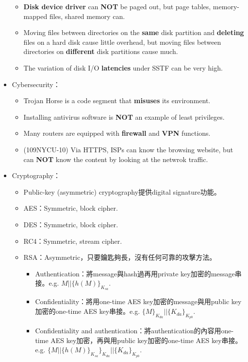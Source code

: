 \begin{itemize}
\begin{itemize}
        \item \textbf{Disk device driver} can \textbf{NOT} be paged out, but page tables, memory-mapped files, shared memory can.
        \item Moving files between directories on the \textbf{same} disk partition and \textbf{deleting} files on a hard disk cause little overhead, but moving files between directories on \textbf{different} disk partitions cause much.
        \item The variation of disk I/O \textbf{latencies} under SSTF can be very high.
    \end{itemize}
    \item Cybersecurity： \begin{itemize}
        \item Trojan Horse is a code segment that \textbf{misuses} its environment.
        \item Installing antivirus software is \textbf{NOT} an example of least privileges.
        \item Many routers are equipped with \textbf{firewall} and \textbf{VPN} functions.
        \item (109NYCU-10) Via HTTPS, ISPs can know the browsing website, but can \textbf{NOT} know the content by looking at the netwrok traffic.
    \end{itemize}
    \item Cryptography： \begin{itemize}
        \item Public-key (asymmetric) cryptography提供digital signature功能。
        \item AES：Symmetric, block cipher.
        \item DES：Symmetric, block cipher.
        \item RC4：Symmetric, stream cipher.
        \item RSA：Asymmetric，只要鑰匙夠長，沒有任何可靠的攻擊方法。\begin{itemize}
            \item Authentication：將message與hash過再用private key加密的message串接。e.g. $M || \{h(M)\}_{K_{sa}}$.
            \item Confidentiality：將用one-time AES key加密的message與用public key加密的one-time AES key串接。e.g. $\{M\}_{K_{da}} || \{K_{da}\}_{K_{pb}}$.
            \item Confidentiality and authentication：將authentication的內容用one-time AES key加密，再與用public key加密的one-time AES key串接。e.g. $\{M || \{h(M)\}_{K_{sa}}\}_{K_{da}} || \{K_{da}\}_{K_{pb}}$.

\end{itemize}
\end{itemize}
\end{itemize}

